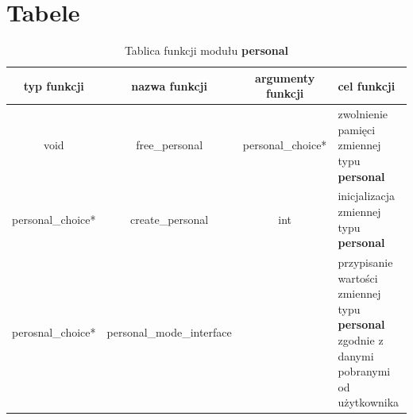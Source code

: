 \documentclass[a4paper]{article}
\begin{document}
\newpage
\section{Tabele}

\begin{table}[h!]
	\centering
	
	\caption{Tablica funkcji modu\l{}u \textbf{personal}}
        \label{table:Tabela1}

	\begin{tabular}{| c | c | c | p{3cm} |}

                \hline
                typ funkcji & nazwa funkcji & argumenty funkcji & cel funkcji \\ \hline \hline

                void    & free\_personal  & personal\_choice* & zwolnienie pami\k{e}ci zmiennej typu \textbf{personal} \\ \hline

                personal\_choice* & create\_personal & int & inicjalizacja zmiennej typu \textbf{personal} \\ \hline

                perosnal\_choice* & personal\_mode\_interface &  & przypisanie warto\'sci zmiennej typu \textbf{personal} zgodnie z danymi pobranymi od u\.zytkownika \\ \hline

        \end{tabular}
\end{table}
\end{document}
